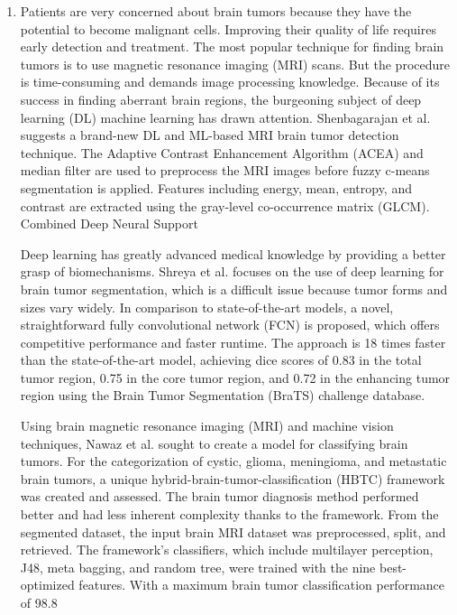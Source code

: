 \documentclass{article}
\begin{document}
\begin{enumerate}
    \item Patients are very concerned about brain tumors because they have the potential to become malignant cells. Improving their quality of life requires early detection and treatment. The most popular technique for finding brain tumors is to use magnetic resonance imaging (MRI) scans. But the procedure is time-consuming and demands image processing knowledge. Because of its success in finding aberrant brain regions, the burgeoning subject of deep learning (DL) machine learning has drawn attention. Shenbagarajan et al. \cite{anantharajan2024mri} suggests a brand-new DL and ML-based MRI brain tumor detection technique. The Adaptive Contrast Enhancement Algorithm (ACEA) and median filter are used to preprocess the MRI images before fuzzy c-means segmentation is applied. Features including energy, mean, entropy, and contrast are extracted using the gray-level co-occurrence matrix (GLCM). Combined Deep Neural Support

    Deep learning has greatly advanced medical knowledge by providing a better grasp of biomechanisms. Shreya et al. \cite{shreyas2017deep}  focuses on the use of deep learning for brain tumor segmentation, which is a difficult issue because tumor forms and sizes vary widely. In comparison to state-of-the-art models, a novel, straightforward fully convolutional network (FCN) is proposed, which offers competitive performance and faster runtime. The approach is 18 times faster than the state-of-the-art model, achieving dice scores of 0.83 in the total tumor region, 0.75 in the core tumor region, and 0.72 in the enhancing tumor region using the Brain Tumor Segmentation (BraTS) challenge database.

    Using brain magnetic resonance imaging (MRI) and machine vision techniques, Nawaz et al. \cite{nawaz2022brain} sought to create a model for classifying brain tumors. For the categorization of cystic, glioma, meningioma, and metastatic brain tumors, a unique hybrid-brain-tumor-classification (HBTC) framework was created and assessed. The brain tumor diagnosis method performed better and had less inherent complexity thanks to the framework. From the segmented dataset, the input brain MRI dataset was preprocessed, split, and retrieved. The framework's classifiers, which include multilayer perception, J48, meta bagging, and random tree, were trained with the nine best-optimized features. With a maximum brain tumor classification performance of 98.8%
    
\end{enumerate}


 

\end{document}
